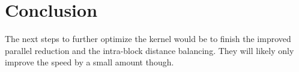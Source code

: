 \section{Conclusion}
\hspace{\parindent}The next steps to further optimize the kernel would be to finish the improved parallel reduction and the intra-block distance balancing. They will likely only improve the speed by a small amount though. 

%  